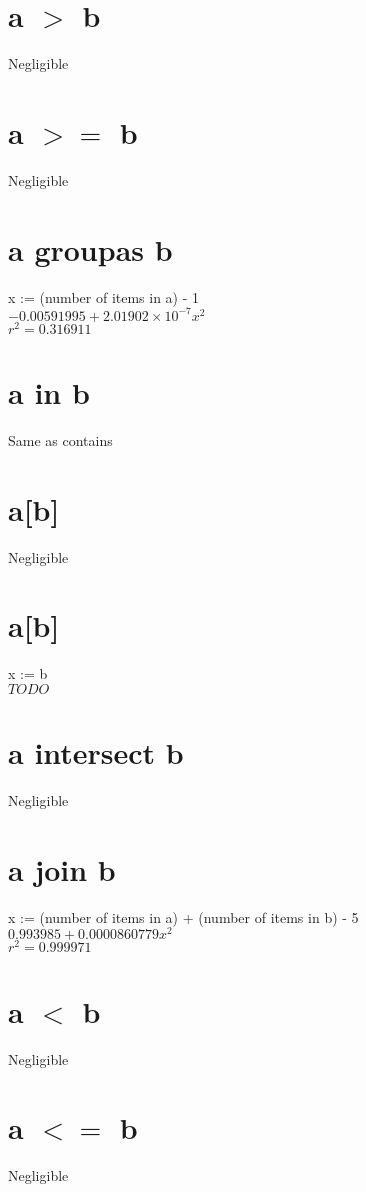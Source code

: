 \documentclass[12pt]{article}
\begin{document}
	\section{a $>$ b}
	Negligible
	
	\section{a $>=$ b}
	Negligible
	
	\section{a groupas b}
	x := (number of items in a) - 1\\
	$-0.00591995 + 2.01902 \times 10^{-7} x^2$\\
	$r^2 = 0.316911$
	
	\section{a in b}
	Same as contains
	
	\section{a[b]}
	Negligible
	
	\section{a[b]}
	x := b\\
	$TODO$
	
	\section{a intersect b}
	Negligible
	
	\section{a join b}
	x := (number of items in a) + (number of items in b) - 5\\
	$0.993985 + 0.0000860779 x^2$\\
	$r^2 = 0.999971$
	
	\section{a $<$ b}
	Negligible
	
	\section{a $<=$ b}
	Negligible
	
\end{document}
